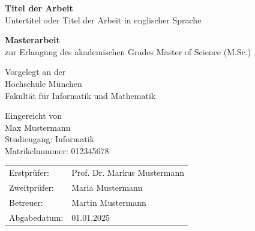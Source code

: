 \begin{titlepage}
  \thispagestyle{empty}


  \vspace{2cm}

  \begin{center}
    {\LARGE \textbf{Titel der Arbeit} \\}
    \vspace{0.5cm}
    {\large Untertitel oder Titel der Arbeit in englischer Sprache}

    \vspace{1.2cm}
    {\large \textbf{Masterarbeit} \\}
    \vspace{0.2cm}
    zur Erlangung des akademischen Grades Master of Science (M.Sc.)

    \vspace{1.2cm}
    Vorgelegt an der \\
    Hochschule München \\
    Fakultät für Informatik und Mathematik

    \vspace{1.2cm}
    Eingereicht von \\
    Max Mustermann \\
    Studiengang: Informatik\\
    Matrikelnummer: 012345678
  \end{center}

  \vfill

\begingroup
\renewcommand{\arraystretch}{1.0}
\begin{tabular}{@{}ll@{}}
  Erstprüfer:  & Prof. Dr. Markus Mustermann \\
  Zweitprüfer: & Maria Mustermann \\
  Betreuer:    & Martin Mustermann \\
  Abgabedatum: & 01.01.2025 \\
\end{tabular}
\endgroup

\end{titlepage}
\addtocounter{page}{1}
